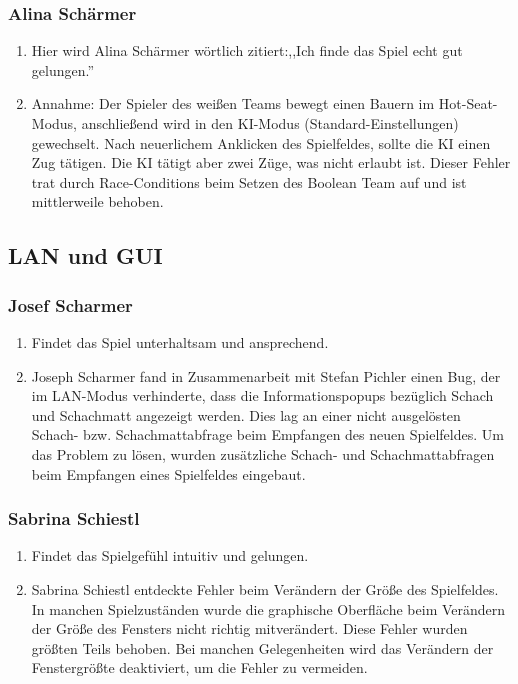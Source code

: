 \documentclass[12pt,a4paper]{article}
\begin{document}
\subsubsection*{Alina Schärmer}
\begin{enumerate}[I]
	\item{Hier wird Alina Schärmer wörtlich zitiert:,,Ich finde das Spiel echt gut gelungen.''}
	\item{Annahme: Der Spieler des weißen Teams bewegt einen Bauern im Hot-Seat-Modus, anschließend wird in den KI-Modus (Standard-Einstellungen) gewechselt. Nach neuerlichem Anklicken des Spielfeldes, sollte die KI einen Zug tätigen. Die KI tätigt aber zwei Züge, was nicht erlaubt ist. Dieser Fehler trat durch Race-Conditions beim Setzen des Boolean Team auf und ist mittlerweile behoben. }
\end{enumerate}

\subsection{LAN und GUI}
\label{SUBSEC:BETALAN}

\subsubsection{Josef Scharmer}
\begin{enumerate}
	\item{Findet das Spiel unterhaltsam und ansprechend.}
	
	\item{Joseph Scharmer fand in Zusammenarbeit mit Stefan Pichler einen Bug, der im LAN-Modus verhinderte, dass die Informationspopups bezüglich Schach und Schachmatt angezeigt werden. Dies lag an einer nicht ausgelösten Schach- bzw. Schachmattabfrage beim Empfangen des neuen Spielfeldes. Um das Problem zu lösen, wurden zusätzliche Schach- und Schachmattabfragen beim Empfangen eines Spielfeldes eingebaut.}
\end{enumerate}

\subsubsection{Sabrina Schiestl}
\begin{enumerate}
	\item{Findet das Spielgefühl intuitiv und gelungen.}

	\item{Sabrina Schiestl entdeckte Fehler beim Verändern der Größe des Spielfeldes. In manchen Spielzuständen wurde die graphische Oberfläche beim Verändern der Größe des Fensters nicht richtig mitverändert. Diese Fehler wurden größten Teils behoben. Bei manchen Gelegenheiten wird das Verändern der Fenstergrößte deaktiviert, um die Fehler zu vermeiden. }
\end{enumerate}
\end{document}
